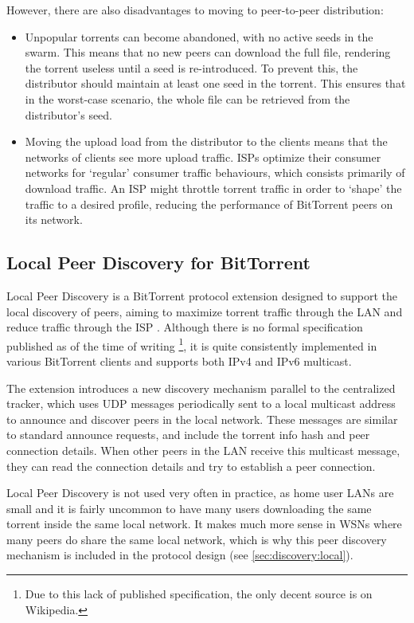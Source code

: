 However, there are also disadvantages to moving to peer-to-peer distribution:
\begin{itemize}
\item Unpopular torrents can become abandoned, with no active seeds in the swarm. This means that no new peers can download the full file, rendering the torrent useless until a seed is re-introduced. To prevent this, the distributor should maintain at least one seed in the torrent. This ensures that in the worst-case scenario, the whole file can be retrieved from the distributor's seed.
\item Moving the upload load from the distributor to the clients means that the networks of clients see more upload traffic. \glspl{ISP} optimize their consumer networks for `regular' consumer traffic behaviours, which consists primarily of download traffic. An \gls{ISP} might throttle torrent traffic in order to `shape' the traffic to a desired profile, reducing the performance of BitTorrent peers on its network.
\end{itemize}

\subsection{Local Peer Discovery for BitTorrent}
\label{sec:related:bt-ldp}
Local Peer Discovery is a BitTorrent protocol extension designed to support the local discovery of peers, aiming to maximize torrent traffic through the \gls{LAN} and reduce traffic through the \gls{ISP} \cite{bt-ldp}. Although there is no formal specification published as of the time of writing \footnote{Due to this lack of published specification, the only decent source \cite{bt-ldp} is on Wikipedia.}, it is quite consistently implemented in various BitTorrent clients and supports both \acrshort{IPv4} and \acrshort{IPv6} multicast.

The extension introduces a new discovery mechanism parallel to the centralized tracker, which uses \gls{UDP} messages periodically sent to a local multicast address to announce and discover peers in the local network. These messages are similar to standard announce requests, and include the torrent info hash and peer connection details. When other peers in the \gls{LAN} receive this multicast message, they can read the connection details and try to establish a peer connection.

Local Peer Discovery is not used very often in practice, as home user \glspl{LAN} are small and it is fairly uncommon to have many users downloading the same torrent inside the same local network. It makes much more sense in \glspl{WSN} where many peers do share the same local network, which is why this peer discovery mechanism is included in the protocol design (see \ref{sec:discovery:local}).

